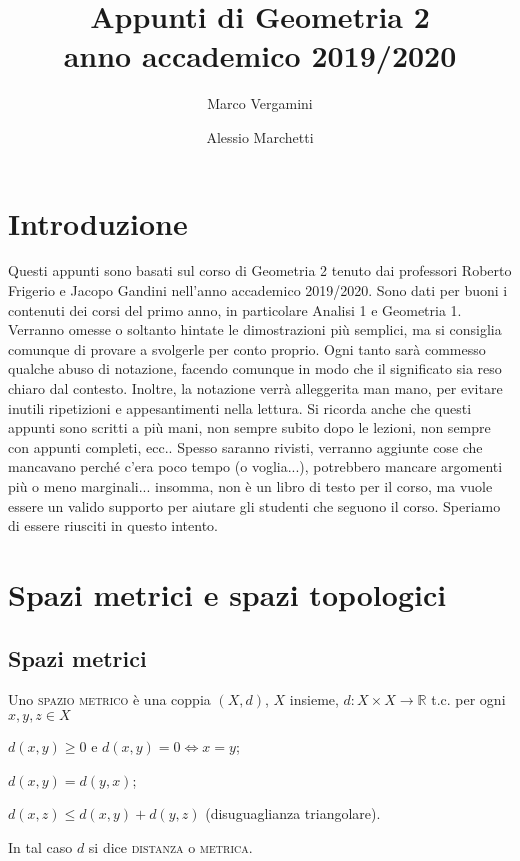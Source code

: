 \documentclass{article}
\title{Appunti di Geometria 2 \\ anno accademico 2019/2020}
\date{}
\author{Marco Vergamini \and Alessio Marchetti}
\begin{document}
\maketitle
\newpage
\tableofcontents
\newpage

\section{Introduzione}
Questi appunti sono basati sul corso di Geometria 2 tenuto dai professori
Roberto Frigerio e Jacopo Gandini nell'anno accademico 2019/2020. Sono dati per
buoni i contenuti dei corsi del primo anno, in particolare Analisi 1 e Geometria
1. Verranno omesse o soltanto hintate le dimostrazioni più semplici, ma si
consiglia comunque di provare a svolgerle per conto proprio. Ogni tanto sarà
commesso qualche abuso di notazione, facendo comunque in modo che il significato
sia reso chiaro dal contesto. Inoltre, la notazione verrà alleggerita man mano,
per evitare inutili ripetizioni e appesantimenti nella lettura. Si ricorda anche che questi appunti sono scritti a più mani, non sempre subito dopo le lezioni, non sempre con appunti completi, ecc.. Spesso saranno rivisti, verranno aggiunte cose che mancavano perché c'era poco tempo (o voglia...), potrebbero mancare argomenti più o meno marginali... insomma, non è un libro di testo per il corso, ma vuole essere un valido supporto per aiutare gli studenti che seguono il corso. Speriamo di essere riusciti in questo intento.


\section{Spazi metrici e spazi topologici}
\subsection{Spazi metrici}
\begin{defn}
	Uno \textsc{spazio metrico} è una coppia $(X, d)$, $X$ insieme,
	${d: X \times X \rightarrow \mathbb{R}}$ t.c. per ogni ${x, y, z \in X}$
    \begin{nlist}
    	\item $d(x, y) \ge 0$ e $d(x, y)=0 \Leftrightarrow x=y$;
    	\item $d(x, y)=d(y, x)$;
    	\item $d(x, z) \le d(x, y)+d(y,z)$ (disuguaglianza triangolare).
    \end{nlist}
	In tal caso $d$ si dice \textsc{distanza} o \textsc{metrica}.
\end{defn}
\end{document}
